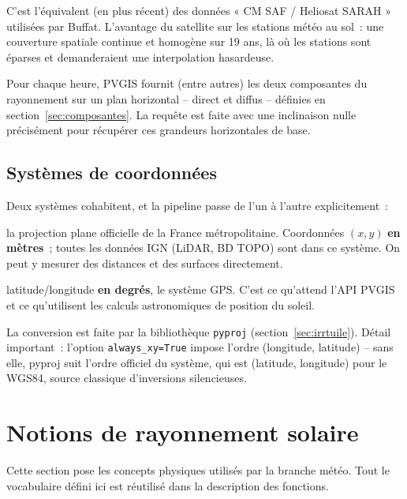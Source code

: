 \documentclass[11pt,a4paper]{article}
\newcommand{\fichier}[1]{\texttt{#1}}
\newcommand{\fonction}[1]{\texttt{#1}}
\begin{document}
C'est l'équivalent (en plus récent) des données « CM SAF / Heliosat SARAH »
utilisées par Buffat. L'avantage du satellite sur les stations météo au sol~:
une couverture spatiale continue et homogène sur 19 ans, là où les stations
sont éparses et demanderaient une interpolation hasardeuse.

Pour chaque heure, PVGIS fournit (entre autres) les deux composantes du
rayonnement sur un plan horizontal -- direct et diffus -- définies en
section~\ref{sec:composantes}. La requête est faite avec une inclinaison nulle
précisément pour récupérer ces grandeurs horizontales de base.

\subsection{Systèmes de coordonnées}

Deux systèmes cohabitent, et la pipeline passe de l'un à l'autre explicitement~:

\begin{description}[style=nextline]
  \item[Lambert 93 (code EPSG 2154)] la projection plane officielle de la France
    métropolitaine. Coordonnées $(x, y)$ \textbf{en mètres}~; toutes les données
    IGN (LiDAR, BD TOPO) sont dans ce système. On peut y mesurer des distances
    et des surfaces directement.
  \item[WGS 84 (code EPSG 4326)] latitude/longitude \textbf{en degrés}, le
    système GPS. C'est ce qu'attend l'API PVGIS et ce qu'utilisent les calculs
    astronomiques de position du soleil.
\end{description}

La conversion est faite par la bibliothèque \fichier{pyproj}
(section~\ref{sec:irrtuile}). Détail important~: l'option
\fonction{always\_xy=True} impose l'ordre (longitude, latitude) -- sans elle,
pyproj suit l'ordre officiel du système, qui est (latitude, longitude) pour le
WGS84, source classique d'inversions silencieuses.

\section{Notions de rayonnement solaire}
\label{sec:notions}

Cette section pose les concepts physiques utilisés par la branche météo. Tout le
vocabulaire défini ici est réutilisé dans la description des fonctions.
\end{document}
